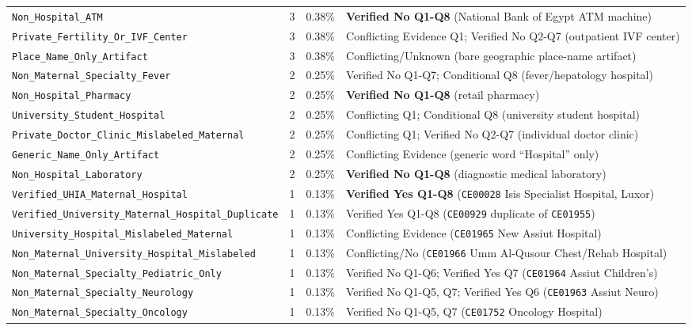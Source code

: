 \documentclass[10pt,a4paper]{article}
\begin{document}
{\begin{table}[ht!]
\begin{tabular}{l r r l}
\texttt{Non\_Hospital\_ATM} & 3 & 0.38\% & \textbf{Verified No Q1-Q8} (National Bank of Egypt ATM machine) \\
\texttt{Private\_Fertility\_Or\_IVF\_Center} & 3 & 0.38\% & Conflicting Evidence Q1; Verified No Q2-Q7 (outpatient IVF center) \\
\texttt{Place\_Name\_Only\_Artifact} & 3 & 0.38\% & Conflicting/Unknown (bare geographic place-name artifact) \\
\texttt{Non\_Maternal\_Specialty\_Fever} & 2 & 0.25\% & Verified No Q1-Q7; Conditional Q8 (fever/hepatology hospital) \\
\texttt{Non\_Hospital\_Pharmacy} & 2 & 0.25\% & \textbf{Verified No Q1-Q8} (retail pharmacy) \\
\texttt{University\_Student\_Hospital} & 2 & 0.25\% & Conflicting Q1; Conditional Q8 (university student hospital) \\
\texttt{Private\_Doctor\_Clinic\_Mislabeled\_Maternal} & 2 & 0.25\% & Conflicting Q1; Verified No Q2-Q7 (individual doctor clinic) \\
\texttt{Generic\_Name\_Only\_Artifact} & 2 & 0.25\% & Conflicting Evidence (generic word ``Hospital'' only) \\
\texttt{Non\_Hospital\_Laboratory} & 2 & 0.25\% & \textbf{Verified No Q1-Q8} (diagnostic medical laboratory) \\
\texttt{Verified\_UHIA\_Maternal\_Hospital} & 1 & 0.13\% & \textbf{Verified Yes Q1-Q8} (\texttt{CE00028} Isis Specialist Hospital, Luxor) \\
\texttt{Verified\_University\_Maternal\_Hospital\_Duplicate} & 1 & 0.13\% & Verified Yes Q1-Q8 (\texttt{CE00929} duplicate of \texttt{CE01955}) \\
\texttt{University\_Hospital\_Mislabeled\_Maternal} & 1 & 0.13\% & Conflicting Evidence (\texttt{CE01965} New Assiut Hospital) \\
\texttt{Non\_Maternal\_University\_Hospital\_Mislabeled} & 1 & 0.13\% & Conflicting/No (\texttt{CE01966} Umm Al-Qusour Chest/Rehab Hospital) \\
\texttt{Non\_Maternal\_Specialty\_Pediatric\_Only} & 1 & 0.13\% & Verified No Q1-Q6; Verified Yes Q7 (\texttt{CE01964} Assiut Children's) \\
\texttt{Non\_Maternal\_Specialty\_Neurology} & 1 & 0.13\% & Verified No Q1-Q5, Q7; Verified Yes Q6 (\texttt{CE01963} Assiut Neuro) \\
\texttt{Non\_Maternal\_Specialty\_Oncology} & 1 & 0.13\% & Verified No Q1-Q5, Q7 (\texttt{CE01752} Oncology Hospital) \\

\end{tabular}
\end{table}}
\end{document}
